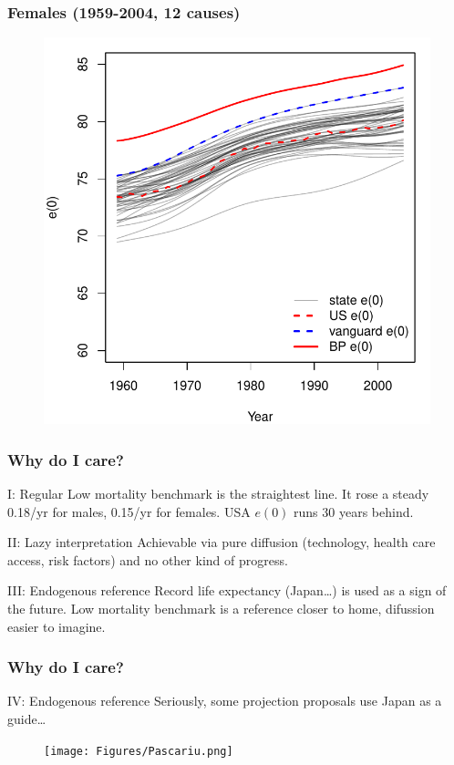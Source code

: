\documentclass[20pt]{beamer}
\begin{document}
\begin{frame}
\frametitle{Females (1959-2004, 12 causes)}
\begin{figure}[b]
    \centering
    \includegraphics[scale=1.2]{Figures/e0trendsF.pdf}
\end{figure} 
\end{frame}

\begin{frame}
\frametitle{Why do I care?}
\begin{block}{I: Regular}
Low mortality benchmark is the straightest line. It rose a steady 0.18/yr for
males, 0.15/yr for females. USA $e(0)$ runs 30 years behind.
\end{block}
\begin{block}{II: Lazy interpretation}
Achievable via pure diffusion
(technology, health care access, risk factors) and no other kind of progress.
\end{block}
\begin{block}{III: Endogenous reference}
Record life expectancy (Japan\ldots) is used as a sign of the future.
Low mortality benchmark is a reference closer to home, difussion easier to imagine.
\end{block}
\end{frame}

\begin{frame}
\frametitle{Why do I care?}
\begin{block}{IV: Endogenous reference}
Seriously, some projection proposals use Japan as a guide\ldots
\end{block}
\begin{figure}[b]
    \centering
    \texttt{[image: Figures/Pascariu.png]}
\end{figure} 
\end{frame}
\end{document}
